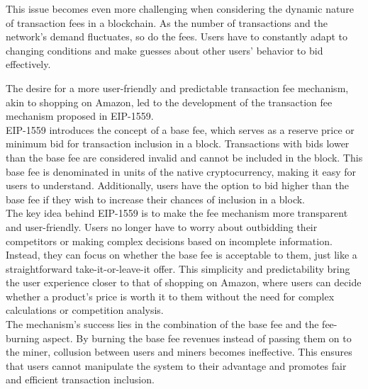 This issue becomes even more challenging when considering the dynamic nature of transaction fees in a blockchain. As the number of transactions and the network's demand fluctuates, so do the fees. Users have to constantly adapt to changing conditions and make guesses about other users' behavior to bid effectively.

The desire for a more user-friendly and predictable transaction fee mechanism, akin to shopping on Amazon, led to the development of the transaction fee mechanism proposed in EIP-1559.\\
EIP-1559 introduces the concept of a base fee, which serves as a reserve price or minimum bid for transaction inclusion in a block. Transactions with bids lower than the base fee are considered invalid and cannot be included in the block. This base fee is denominated in units of the native cryptocurrency, making it easy for users to understand. Additionally, users have the option to bid higher than the base fee if they wish to increase their chances of inclusion in a block.\\

The key idea behind EIP-1559 is to make the fee mechanism more transparent and user-friendly. Users no longer have to worry about outbidding their competitors or making complex decisions based on incomplete information. Instead, they can focus on whether the base fee is acceptable to them, just like a straightforward take-it-or-leave-it offer. This simplicity and predictability bring the user experience closer to that of shopping on Amazon, where users can decide whether a product's price is worth it to them without the need for complex calculations or competition analysis.\\

The mechanism's success lies in the combination of the base fee and the fee-burning aspect. By burning the base fee revenues instead of passing them on to the miner, collusion between users and miners becomes ineffective. This ensures that users cannot manipulate the system to their advantage and promotes fair and efficient transaction inclusion.

